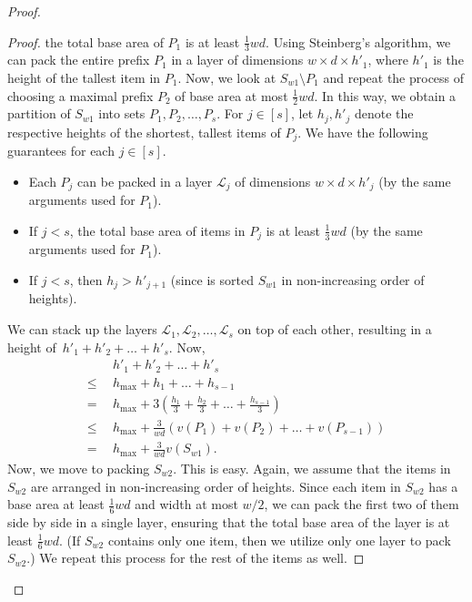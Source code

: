 \documentclass[10pt,a4paper]{amsart}
\newcommand{\kvn}[1]{#1}
\theoremstyle{definition}
\begin{document}
\begin{proof}
\begin{proof}
    the total base area of $P_1$ is at least $\frac13wd$. Using Steinberg's algorithm, we can pack the entire prefix $P_1$
    in a layer of dimensions $w\times d\times h'_1$, where $h'_1$ is the height of the tallest item in $P_1$. Now, we look at $S_{w1}\setminus P_1$ and repeat the process of choosing a maximal prefix $P_2$ of base area at most $\frac12wd$. In this way, we obtain a partition of
    $S_{w1}$ into sets $P_1,P_2,\dots,P_s$. For $j\in[s]$, let $h_j,h'_j$ denote the respective heights of the shortest, tallest items of $P_j$. We have the following guarantees for each $j\in[s]$.
    \begin{itemize}
        \item Each $P_j$ can be packed in a layer $\mathcal L_j$ of dimensions $w\times d\times h'_j$ (by the same arguments used for $P_1$).
        \item If $j<s$, the total base area of items in $P_j$ is at least $\frac13wd$ (by the same arguments used for $P_1$).
        \item If $j<s$, then $h_j>h'_{j+1}$ (since is sorted $S_{w1}$ in non-increasing order of heights).
    \end{itemize}
    We can stack up the layers $\mathcal L_1,\mathcal L_2,\dots,\mathcal L_s$ on top of each other, resulting in a height of~$h'_1+h'_2+\dots+h'_s$. Now,
    \begin{align}
        &h'_1+h'_2+\dots+h'_s\nonumber\\
        \le\:\:& h_{\max}+h_1+\dots+h_{s-1}\nonumber\\
                        =\:\:&  h_{\max}+3\left(\frac{h_1}{3}+\frac{h_2}{3}+\dots+\frac{h_{s-1}}{3}\right)\nonumber\\ 
                        \le\:\:& h_{\max}+\frac{3}{wd}\left(v(P_1)+v(P_2)+\dots+v(P_{s-1})\right)\tag{since each $P_j$, except the last, has a base area of at least $1/3$}\nonumber\\
                        =\:\:& h_{\max}+\frac{3}{wd}v(S_{w1})\label{eq:telescope}.
    \end{align}
    Now, we move to packing $S_{w2}$. This is easy. Again, we assume that the items in $S_{w2}$ are arranged in non-increasing order of heights.
    Since each item in $S_{w2}$ has a base area at least $\frac16wd$ and width at most $w/2$, we can pack the first two of them side by side in a single layer, ensuring that the total base area of the layer is at least $\frac16wd$. \kvn{(If $S_{w2}$ contains only one item, then we utilize only one layer to pack $S_{w2}$.)} We repeat this process for the rest of the items as well.

\end{proof}
\end{proof}
\end{document}
